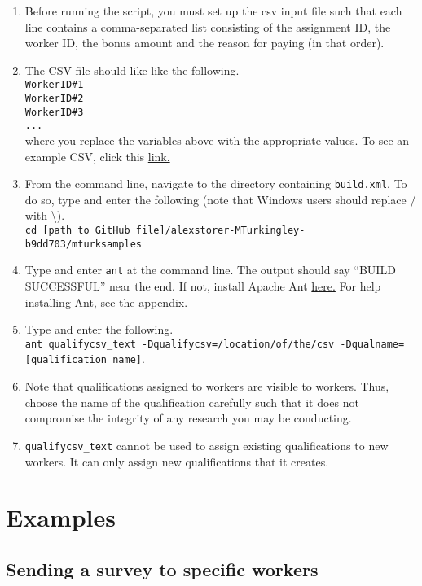 \documentclass[10pt]{article}
\begin{document}
\begin{enumerate}
\item Before running the script, you must set up the csv input file such that each line contains a comma-separated list consisting of the assignment ID, the worker ID, the bonus amount and the reason for paying (in that order). 
\item The CSV file should like like the following.\\
\verb+WorkerID#1+\\
\verb+WorkerID#2+\\
\verb+WorkerID#3+\\
\verb+...+\\
where you replace the variables above with the appropriate values. To see an example CSV, click this \href{https://dl.dropbox.com/u/9693706/qualify.csv}{link.}
\item From the command line, navigate to the directory containing \verb+build.xml+. To do so, type and enter the following (note that Windows users should replace / with \textbackslash).\\
	\verb+cd [path to GitHub file]/alexstorer-MTurkingley-b9dd703/mturksamples+
	\item Type and enter \verb+ant+ at the command line. The output should say ``BUILD SUCCESSFUL'' near the end. If not, install Apache Ant \href{http://ant.apache.org/}{here.} For help installing Ant, see the appendix.
	\item Type and enter the following.\\ \verb+ant qualifycsv_text -Dqualifycsv=/location/of/the/csv -Dqualname=[qualification name]+.
\item Note that qualifications assigned to workers are visible to workers. Thus, choose the name of the qualification carefully such that 
it does not compromise the integrity of any research you may be conducting.
\item \verb+qualifycsv_text+ cannot be used to assign existing qualifications to new workers. It can only assign new qualifications that it
creates. 
\end{enumerate}

\section*{Examples}

\subsection*{Sending a survey to specific workers}
\end{document}
